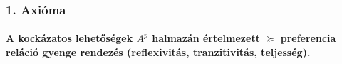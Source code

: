 \documentclass[a4paper,12pt]{article}
\begin{document}



\subsubsection{1. Axióma}
\paragraph{A kockázatos lehetőségek $A^p$ halmazán értelmezett $\succeq$ preferencia reláció gyenge rendezés (reflexivitás, tranzitivitás, teljesség).}
\end{document}
